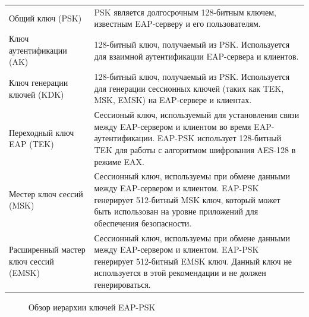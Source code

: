 \begin{longtable}[\textwidth]{p{}p{}}
 Общий ключ (PSK) & PSK является долгосрочным 128-битным ключем, известным EAP-серверу и его пользователям. \\
 Ключ аутентификации (AK) & 128-битный ключ, получаемый из PSK. Используется для взаимной аутентификации EAP-сервера и клиентов. \\
 Ключ генерации ключей (KDK) & 128-битный ключ, получаемый из PSK. Используется для генерации сессионных ключей (таких как TEK, MSK, EMSK) на EAP-сервере и клиентах. \\
 Переходный ключ EAP (TEK) & Сессионый ключ, используемый для установления связи между EAP-сервером и клиентом во время EAP-аутентификации. EAP-PSK использует 128-битный TEK для работы с алгоритмом шифрования AES-128 в режиме EAX. \\
 Местер ключ сессий (MSK) & Сессионный ключ, используемы при обмене данными между EAP-сервером и клиентом. EAP-PSK генерирует 512-битный MSK ключ, который может быть использован на уровне приложений для обеспечения безопасности. \\
 Расширенный мастер ключ сессий (EMSK) & Сессионный ключ, используемы при обмене данными между EAP-сервером и клиентом. EAP-PSK генерирует 512-битный EMSK ключ. Данный ключ не используется в этой рекомендации и не должен генерироваться. \\
\end{longtable}


\begin{figure}[h]
\caption{Обзор иерархии ключей EAP-PSK}
\label{img:10-3}
\end{figure}

